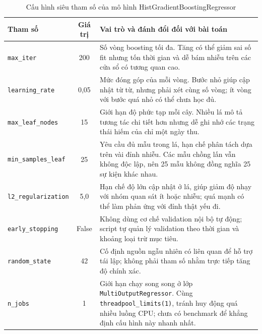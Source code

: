 \begin{table}[htbp]
        \centering
        \caption{Cấu hình siêu tham số của mô hình HistGradientBoostingRegressor}
        \label{tab:hyperparameter_config}
        \begin{tabular}{|l|c|p{11.5cm}|}
            \hline
            \textbf{Tham số} & \textbf{Giá trị} & \textbf{Vai trò và đánh đổi đối với bài toán} \\
            \hline
            \texttt{max\_iter} & 200 & Số vòng boosting tối đa. Tăng có thể giảm sai số fit nhưng tốn thời gian và dễ bám nhiễu trên các cửa sổ có tương quan cao. \\
            \hline
            \texttt{learning\_rate} & 0,05 & Mức đóng góp của mỗi vòng. Bước nhỏ giúp cập nhật từ từ, nhưng phải xét cùng số vòng; ít vòng với bước quá nhỏ có thể chưa học đủ. \\
            \hline
            \texttt{max\_leaf\_nodes} & 15 & Giới hạn độ phức tạp mỗi cây. Nhiều lá mô tả tương tác chi tiết hơn nhưng dễ ghi nhớ các trạng thái hiếm của chỉ một ngày thu. \\
            \hline
            \texttt{min\_samples\_leaf} & 25 & Yêu cầu đủ mẫu trong lá, hạn chế phân tách dựa trên vài đỉnh nhiễu. Các mẫu chồng lấn vẫn không độc lập, nên 25 mẫu không đồng nghĩa 25 sự kiện khác nhau. \\
            \hline
            \texttt{l2\_regularization} & 5,0 & Hạn chế độ lớn cập nhật ở lá, giúp giảm độ nhạy với nhóm quan sát ít hoặc nhiễu; quá mạnh có thể làm phản ứng với đỉnh thật yếu đi. \\
            \hline
            \texttt{early\_stopping} & False & Không dùng cơ chế validation nội bộ tự động; script tự quản lý validation theo thời gian và khoảng loại trừ mục tiêu. \\
            \hline
            \texttt{random\_state} & 42 & Cố định nguồn ngẫu nhiên có liên quan để hỗ trợ tái lập; không phải tham số nhằm trực tiếp tăng độ chính xác. \\
            \hline
            \texttt{n\_jobs} & 1 & Giới hạn chạy song song ở lớp \texttt{MultiOutputRegressor}. Cùng \texttt{threadpool\_limits(1)}, tránh huy động quá nhiều luồng CPU; chưa có benchmark để khẳng định cấu hình này nhanh nhất. \\
            \hline
        \end{tabular}
    \end{table}